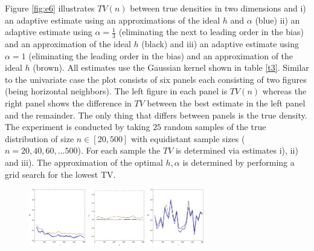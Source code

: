 \documentclass[
twoside,
openright,
titlepage,
numbers=noenddot,
headinclude,%
footinclude=true,
dottedtoc, %
ngerman,
american, %
pagesize=pdftex,
]{book}
\begin{document}
	\begin{example}
		Figure \ref{fig:e6} illustrates $TV(n)$ between true densities in two dimensions and i) an adaptive estimate using an approximations of the ideal $h$ and $\alpha$ (blue) ii) an adaptive estimate using $\alpha=\frac{1}{3}$ (eliminating the next to leading order in the bias) and an approximation of the ideal $h$ (black) and iii) an adaptive estimate using $\alpha=1$ (eliminating the leading order in the bias) and an approximation of the ideal $h$ (brown). All estimates use the Gaussian kernel shown in table \ref{t3}.  Similar to the univariate case the plot consists of six panels each consisting of two figures (being horizontal neighbors). The left figure in each panel is $TV(n)$ whereas the right panel shows the difference in $TV$ between the best estimate in the left panel and the remainder. The only thing that differs between panels is the true density. \newline	
		The experiment is conducted by taking $25$ random samples of the true distribution of size $n\in [20,500]$ with equidistant sample sizes ($n=20,40,60,\dots 500$). For each sample the $TV$ is determined via estimates i), ii) and iii). The approximation of the optimal $h,\alpha$ is determined by performing a grid search for the lowest TV.
		\begin{figure}[H]
			\centering
			\captionsetup{width=0.95\textwidth}
			\includegraphics[width=0.22\textwidth]{figures/2DTVexamples/n1}
			\includegraphics[width=0.22\textwidth]{figures/2DTVexamples/n2}
			\includegraphics[width=0.22\textwidth]{figures/2DTVexamples/t1}

\end{figure}
\end{example}
\end{document}
